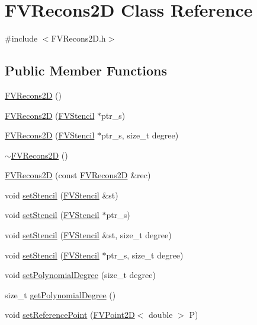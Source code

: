\hypertarget{classFVRecons2D}{
\section{FVRecons2D Class Reference}
\label{d3/dde/classFVRecons2D}
}


{\ttfamily \#include $<$FVRecons2D.h$>$}

\subsection*{Public Member Functions}
\begin{DoxyCompactItemize}
\item 
\hyperlink{classFVRecons2D_a8dcae930edb192e8d7746e6031eb0867}{FVRecons2D} ()
\item 
\hyperlink{classFVRecons2D_ae47016c5a6bf585400dc3c8bb3cac92f}{FVRecons2D} (\hyperlink{classFVStencil}{FVStencil} $\ast$ptr\_\-s)
\item 
\hyperlink{classFVRecons2D_a22338ce4847ebe33f1e9df7812ef2ff6}{FVRecons2D} (\hyperlink{classFVStencil}{FVStencil} $\ast$ptr\_\-s, size\_\-t degree)
\item 
\hyperlink{classFVRecons2D_afb0d79b083085e220cd997f303bd3167}{$\sim$FVRecons2D} ()
\item 
\hyperlink{classFVRecons2D_a82e142c7d6224286ced86967aa11b349}{FVRecons2D} (const \hyperlink{classFVRecons2D}{FVRecons2D} \&rec)
\item 
void \hyperlink{classFVRecons2D_a34d8474a5f5470cab6f077871c7387da}{setStencil} (\hyperlink{classFVStencil}{FVStencil} \&st)
\item 
void \hyperlink{classFVRecons2D_a9fd35e2a4d7096ce3fec84bfc30bf095}{setStencil} (\hyperlink{classFVStencil}{FVStencil} $\ast$ptr\_\-s)
\item 
void \hyperlink{classFVRecons2D_a82cbc1bab2638e760ea3ca50bd393ba6}{setStencil} (\hyperlink{classFVStencil}{FVStencil} \&st, size\_\-t degree)
\item 
void \hyperlink{classFVRecons2D_a6d820346769771af609dbdaa7b1f3021}{setStencil} (\hyperlink{classFVStencil}{FVStencil} $\ast$ptr\_\-s, size\_\-t degree)
\item 
void \hyperlink{classFVRecons2D_a277a64063b5e54974f88aa36f01dd729}{setPolynomialDegree} (size\_\-t degree)
\item 
size\_\-t \hyperlink{classFVRecons2D_a51ced9e32566282ad2c8aa54e23f3cc5}{getPolynomialDegree} ()
\item 
void \hyperlink{classFVRecons2D_adefd5b78a5f9730ed90fa03fe7ddb671}{setReferencePoint} (\hyperlink{classFVPoint2D}{FVPoint2D}$<$ double $>$ P)

\end{DoxyCompactItemize}

